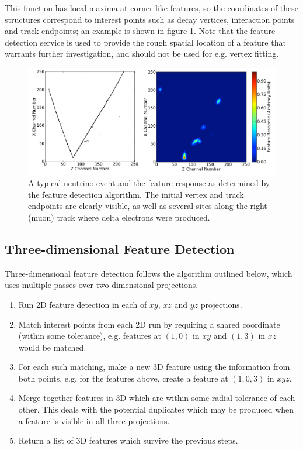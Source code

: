 This function has local maxima at corner-like features, so the coordinates of these structures correspond to interest points such as decay vertices, interaction points and track endpoints; an example is shown in figure \ref{fig:feature-response}. Note that the feature detection service is used to provide the rough spatial location of a feature that warrants further investigation, and should not be used for e.g. vertex fitting.

\begin{figure}
    \includegraphics[width=\textwidth]{chapters/latte_images/feature-response}
    \caption{\label{fig:feature-response}A typical neutrino event and the feature response as determined by the feature detection algorithm. The initial vertex and track endpoints are clearly visible, as well as several sites along the right (muon) track where delta electrons were produced.}
\end{figure}

\subsection{Three-dimensional Feature Detection}
Three-dimensional feature detection follows the algorithm outlined below, which uses multiple passes over two-dimensional projections.
\begin{enumerate}
    \item Run 2D feature detection in each of $xy$, $xz$ and $yz$ projections.
    \item Match interest points from each 2D run by requiring a shared coordinate (within some tolerance), e.g. features at $(1,0)$ in $xy$ and $(1,3)$ in $xz$ would be matched.
    \item For each such matching, make a new 3D feature using the information from both points, e.g. for the features above, create a feature at $(1,0,3)$ in $xyz$.
    \item Merge together features in 3D which are within some radial tolerance of each other. This deals with the potential duplicates which may be produced when a feature is visible in all three projections.
    \item Return a list of 3D features which survive the previous steps.
\end{enumerate}

